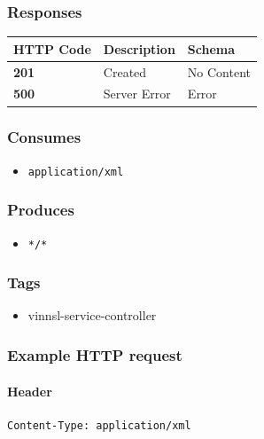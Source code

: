 \subsubsection{Responses}\label{responses}

\begin{longtable}[]{@{}lll@{}}
\toprule
HTTP Code & Description & Schema\tabularnewline
\midrule
\endhead
\textbf{201} & Created & No Content\tabularnewline
\textbf{500} & Server Error & Error\tabularnewline
\bottomrule
\end{longtable}

\subsubsection{Consumes}\label{consumes}

\begin{itemize}
\tightlist
\item
  \texttt{application/xml}
\end{itemize}

\subsubsection{Produces}\label{produces}

\begin{itemize}
\tightlist
\item
  \texttt{*/*}
\end{itemize}

\subsubsection{Tags}\label{tags}

\begin{itemize}
\tightlist
\item
  vinnsl-service-controller
\end{itemize}

\subsubsection{Example HTTP request}\label{example-http-request}

\paragraph{Header}\label{header}

\begin{verbatim}
Content-Type: application/xml
\end{verbatim}

